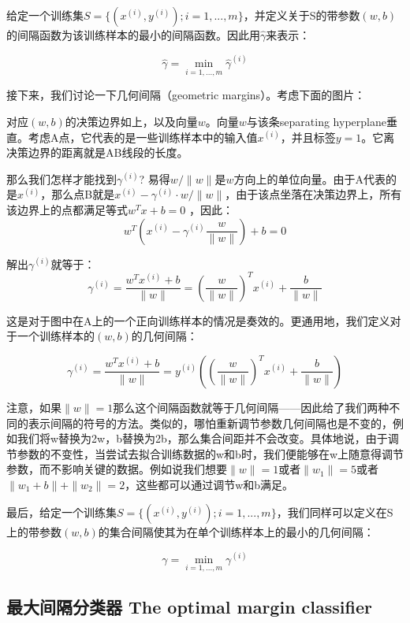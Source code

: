 \documentclass[UTF8]{ctexart}
\begin{document}
给定一个训练集$S = \{(x^{(i)},y^{(i)});i=1,...,m \}$，并定义关于S的带参数$(w,b)$的间隔函数为该训练样本的最小的间隔函数。因此用$\hat{\gamma}$来表示：

\[\hat{\gamma} = \mathop{min}\limits_{i=1,...,m} \hat{\gamma}^{(i)} \]

接下来，我们讨论一下几何间隔（geometric margins）。考虑下面的图片：

\begin{figure}[htb]        
\end{figure}

 对应$(w,b)$的决策边界如上，以及向量$w$。向量$w$与该条separating hyperplane垂直。考虑A点，它代表的是一些训练样本中的输入值$x^{(i)}$，并且标签$y=1$。它离决策边界的距离就是AB线段的长度。

 那么我们怎样才能找到$\gamma^{(i)}$? 易得$w/\|w\|$是$w$方向上的单位向量。由于A代表的是$x^{(i)}$，那么点B就是$x^{(i)}-\gamma^{(i)} \cdot w/\|w\|$，由于该点坐落在决策边界上，所有该边界上的点都满足等式$w^{T}x+b = 0 $ ，因此：\[w^{T}(x^{(i)}-\gamma^{(i)} \frac{w}{\|w \|})+b=0 \]

 解出$\gamma^{(i)}$就等于：\[ \gamma^{(i)} = \frac{w^{T}x^{(i)}+b}{\|w\|}  = (\frac{w}{\|w\|})^{T}x^{(i)} + \frac{b}{\|w\|} \]


这是对于图中在A上的一个正向训练样本的情况是奏效的。更通用地，我们定义对于一个训练样本的$(w,b)$的几何间隔：

\[ \gamma^{(i)} = \frac{w^{T}x^{(i)}+b}{\|w\|}  =  y^{(i)} (  (\frac{w}{\|w\|})^{T}x^{(i)} + \frac{b}{\|w\|}  )\]

注意，如果$\|w\|=1$那么这个间隔函数就等于几何间隔——因此给了我们两种不同的表示间隔的符号的方法。类似的，哪怕重新调节参数几何间隔也是不变的，例如我们将w替换为2w，b替换为2b，那么集合间距并不会改变。具体地说，由于调节参数的不变性，当尝试去拟合训练数据的w和b时，我们便能够在w上随意得调节参数，而不影响关键的数据。例如说我们想要$\|w\|=1$或者$\|w_{1}\|=5$或者$\|w_{1}+b\|+\|w_{2}\|=2$，这些都可以通过调节w和b满足。

最后，给定一个训练集$S = \{(x^{(i)},y^{(i)});i=1,...,m \}$，我们同样可以定义在S上的带参数$(w,b)$的集合间隔使其为在单个训练样本上的最小的几何间隔：


\[\gamma = \mathop{min}\limits_{i=1,...,m} \gamma^{(i)} \]





\subsection{最大间隔分类器 The optimal margin classifier}
\end{document}
